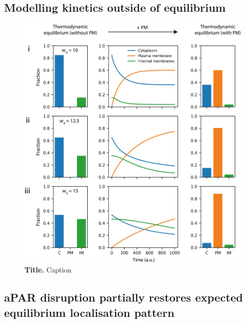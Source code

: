 \documentclass[12pt]{"article"}
\newcommand{\mycaption}[2]{\caption[#1]{\textbf{#1.} #2}}
\begin{document}


\subsection{Modelling kinetics outside of equilibrium}


\begin{figure}[!h]
\includegraphics[scale=0.95]{three_surface_kinetic}
\setlength{\abovecaptionskip}{20pt}
\centering
\mycaption{Title}{Caption}
\label{fig:three_surface_kinetic}
\end{figure}


\subsection{aPAR disruption partially restores expected equilibrium localisation pattern}
\end{document}
